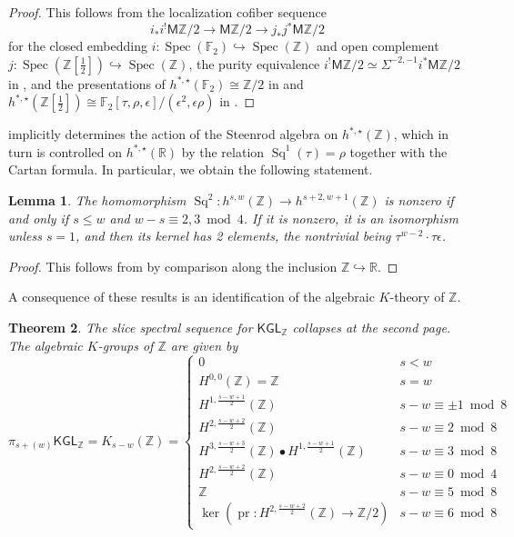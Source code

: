 \documentclass[11pt,hyp,english]{article}
\newcommand{\Z}{\mathbb{Z}}
\newcommand{\FF}{\mathbb{F}}
\newcommand{\KGL}{\mathsf{KGL}}
\newcommand{\MZ}{\mathsf{M}\Z}
\newcommand{\R}{\mathbb{R}}
\newcommand{\Spec}{\operatorname{Spec}}
\newcommand{\Sq}{\operatorname{Sq}}
\newcommand{\pr}{\operatorname{pr}}
\let\iso=\cong
\newtheorem{theorem}{Theorem}[section]
\newtheorem{lemma}[theorem]{Lemma}
\theoremstyle{definition}
\begin{document}
\begin{proof}
This follows from the localization cofiber sequence
\[ i_\ast i^! \MZ/2\to \MZ/2 \to j_\ast j^\ast \MZ/2 \]
for the closed embedding $i\colon \Spec(\FF_2)\hookrightarrow \Spec(\Z)$ 
and open complement $j\colon \Spec(\Z[\frac{1}{2}])\hookrightarrow \Spec(\Z)$, 
the purity equivalence $i^!\MZ/2\simeq \Sigma^{-2,-1}i^\ast \MZ/2$ 
in \cite[Theorem 7.2]{rs.lecture},  
and the presentations of $h^{\ast,\star}(\FF_2)\cong \Z/2$ 
in \cite{kato.milnor-char2} and 
$h^{\ast,\star}(\Z[\frac{1}{2}]) \iso 
\FF_2[\tau,\rho,\epsilon]/(\epsilon^2,\epsilon\rho)$ 
in \cite{arXiv:2311.13304}.
\end{proof}

 implicitly determines the action of the Steenrod algebra on $h^{\ast,\star}(\Z)$, which in turn is controlled on $h^{\ast,\star}(\R)$ by the relation $\Sq^1(\tau)=\rho$ together with the Cartan formula.  
In particular, we obtain the following statement.  

\begin{lemma}\label{lem:steenrod-hZ}
The homomorphism $\Sq^2\colon h^{s,w}(\Z)\to h^{s+2,w+1}(\Z)$ is nonzero if and only if $s\leq w$ and $w-s\equiv 2,3 \bmod 4$.
If it is nonzero, it is an isomorphism unless $s=1$, and then its kernel has 2 elements, the nontrivial being $\tau^{w-2}\cdot \tau\epsilon$.
\end{lemma}

\begin{proof}
    This follows from  by comparison along the inclusion $\Z\hookrightarrow \R$.
\end{proof}

A consequence of these results is an identification of the algebraic $K$-theory of $\Z$.

\begin{theorem}\label{thm:slice-spec-seq-KGLZ}
The slice spectral sequence for $\KGL_\Z$ collapses at the second page.
The algebraic $K$-groups of $\Z$ are given by 
\[ \pi_{s+(w)}\KGL_\Z = K_{s-w}(\Z) = 
\begin{cases} 
0 & s<w \\
H^{0,0}(\Z)=\Z & s=w \\
H^{1,\frac{s-w+1}{2}}(\Z) & s-w\equiv \pm 1\bmod 8 \\
H^{2,\frac{s-w+2}{2}}(\Z) & s-w\equiv 2 \bmod 8 \\
H^{3,\frac{s-w+3}{2}}(\Z)\bullet H^{1,\frac{s-w+1}{2}}(\Z) & s-w\equiv 3\bmod 8\\
H^{2, \frac{s-w+2}{2}}(\Z) & s-w\equiv 0 \bmod 4 \\
\Z  & s-w\equiv 5\bmod 8 \\
\ker (\pr\colon H^{2,\frac{s-w+2}{2}}(\Z)\to \Z/2) & s-w\equiv 6 \bmod 8
\end{cases}
\]
\end{theorem}
\end{document}

